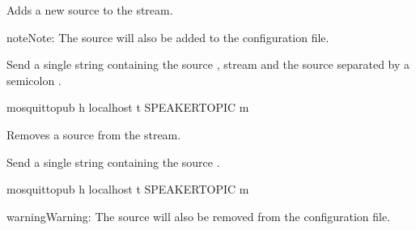 \documentclass[letterpaper,10pt,english]{sphinxmanual}
\begin{document}
\begin{fulllineitems}
\begin{fulllineitems}
\end{fulllineitems}



\begin{fulllineitems}

\pysigstartsignatures
{}
\pysigstopsignatures
\sphinxAtStartPar
Adds a new source to the stream.

\begin{sphinxadmonition}{note}{Note:}
\sphinxAtStartPar
The source will also be added to the configuration file.
\end{sphinxadmonition}

\sphinxAtStartPar
Send a single string containing the source , stream  and the source 
separated by a semicolon \sphinxcode{\sphinxupquote{;}}.

\begin{sphinxVerbatim}[commandchars=\\\{\}]
mosquitto\PYGZus{}pub \PYGZhy{}h localhost \PYGZhy{}t \PYGZpc{}SPEAKER\PYGZus{}TOPIC \PYGZhy{}m 
\end{sphinxVerbatim}

\end{fulllineitems}



\begin{fulllineitems}

\pysigstartsignatures
{}
\pysigstopsignatures
\sphinxAtStartPar
Removes a source from the stream.

\sphinxAtStartPar
Send a single string containing the source .

\begin{sphinxVerbatim}[commandchars=\\\{\}]
mosquitto\PYGZus{}pub \PYGZhy{}h localhost \PYGZhy{}t \PYGZpc{}SPEAKER\PYGZus{}TOPIC \PYGZhy{}m 
\end{sphinxVerbatim}

\begin{sphinxadmonition}{warning}{Warning:}
\sphinxAtStartPar
The source will also be removed from the configuration file.
\end{sphinxadmonition}

\end{fulllineitems}


\end{fulllineitems}




\renewcommand{\indexname}{Index}
\printindex
\end{document}
